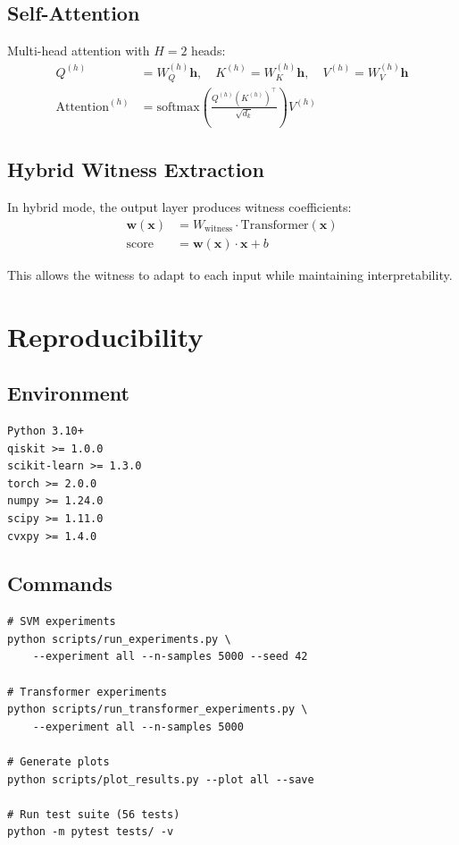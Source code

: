 \documentclass[11pt,a4paper]{article}
\begin{document}
\subsection{Self-Attention}

Multi-head attention with $H=2$ heads:
\begin{align}
Q^{(h)} &= W_Q^{(h)} \mathbf{h}, \quad K^{(h)} = W_K^{(h)} \mathbf{h}, \quad V^{(h)} = W_V^{(h)} \mathbf{h} \\
\text{Attention}^{(h)} &= \text{softmax}\left(\frac{Q^{(h)} (K^{(h)})^\top}{\sqrt{d_k}}\right) V^{(h)}
\end{align}

\subsection{Hybrid Witness Extraction}

In hybrid mode, the output layer produces witness coefficients:
\begin{align}
\mathbf{w}(\mathbf{x}) &= W_{\text{witness}} \cdot \text{Transformer}(\mathbf{x}) \\
\text{score} &= \mathbf{w}(\mathbf{x}) \cdot \mathbf{x} + b
\end{align}

This allows the witness to adapt to each input while maintaining interpretability.

\section{Reproducibility}

\subsection{Environment}

\begin{verbatim}
Python 3.10+
qiskit >= 1.0.0
scikit-learn >= 1.3.0
torch >= 2.0.0
numpy >= 1.24.0
scipy >= 1.11.0
cvxpy >= 1.4.0
\end{verbatim}

\subsection{Commands}

\begin{verbatim}
# SVM experiments
python scripts/run_experiments.py \
    --experiment all --n-samples 5000 --seed 42

# Transformer experiments
python scripts/run_transformer_experiments.py \
    --experiment all --n-samples 5000

# Generate plots
python scripts/plot_results.py --plot all --save

# Run test suite (56 tests)
python -m pytest tests/ -v
\end{verbatim}
\end{document}
